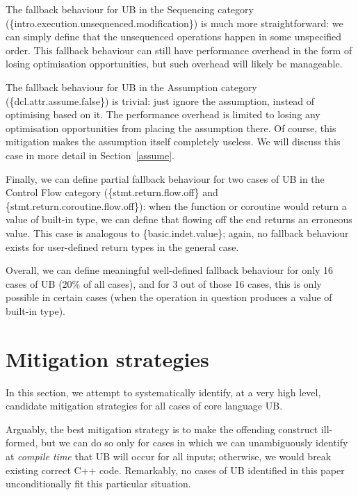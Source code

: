 The fallback behaviour for UB in the Sequencing category (\{intro.execution.unsequenced.modifica\-tion\})
is much more straightforward: we can simply define that the unsequenced operations happen in some unspecified order. This fallback behaviour can still have performance overhead in the form of losing  optimisation opportunities, but such overhead will likely be manageable. 

The fallback behaviour for UB in the Assumption category (\{dcl.attr.assume.false\}) is trivial: just ignore the assumption, instead of optimising based on it. The performance overhead is limited to losing any optimisation opportunities from placing the assumption there. Of course, this mitigation makes the assumption itself completely useless. We will discuss this case in more detail in Section~\ref{assume}.

Finally, we can define partial fallback behaviour for two cases of UB in the Control Flow category  (\{stmt.return.flow.off\} and \{stmt.return.coroutine.flow.off\}): when the function or coroutine would return a value of built-in type, we can define that flowing off the end returns an erroneous value. This case is analogous to \{basic.indet.value\}; again, no fallback behaviour exists for user-defined return types in the general case.

Overall, we can define meaningful well-defined fallback behaviour for only 16 cases of UB (20\% of all cases), and for 3 out of those 16 cases, this is only possible in certain cases (when the operation in question produces a value of built-in type).

\section{Mitigation strategies}
\label{mitigation}

In this section, we attempt to systematically identify, at a very high level, candidate mitigation strategies for all cases of core language UB.


Arguably, the best mitigation strategy is to make the offending construct ill-formed, but we can do so only for cases in which we can unambiguously identify at \emph{compile time} that UB will occur for all inputs; otherwise, we would break existing correct C++ code. Remarkably, no cases of UB identified in this paper unconditionally fit this particular situation.

